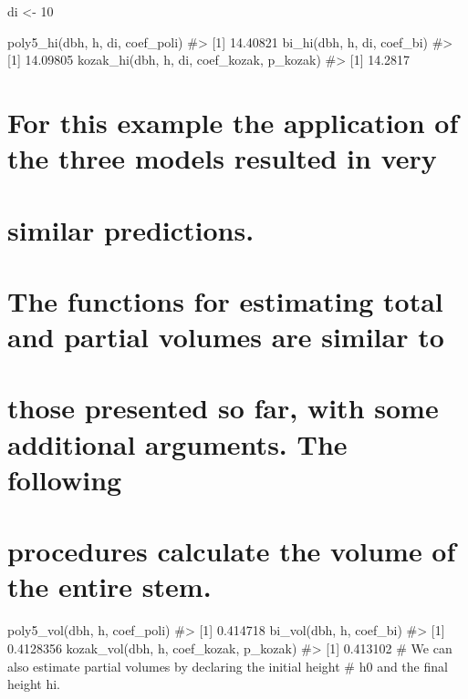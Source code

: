 \documentclass[
]{article}
\begin{document}
di \textless- 10

poly5\_hi(dbh, h, di, coef\_poli) \#\textgreater{} {[}1{]} 14.40821
bi\_hi(dbh, h, di, coef\_bi) \#\textgreater{} {[}1{]} 14.09805
kozak\_hi(dbh, h, di, coef\_kozak, p\_kozak) \#\textgreater{} {[}1{]}
14.2817

\hypertarget{for-this-example-the-application-of-the-three-models-resulted-in-very}{%
\section{For this example the application of the three models resulted
in
very}\label{for-this-example-the-application-of-the-three-models-resulted-in-very}}

\hypertarget{similar-predictions.}{%
\section{similar predictions.}\label{similar-predictions.}}

\hypertarget{the-functions-for-estimating-total-and-partial-volumes-are-similar-to}{%
\section{The functions for estimating total and partial volumes are
similar
to}\label{the-functions-for-estimating-total-and-partial-volumes-are-similar-to}}

\hypertarget{those-presented-so-far-with-some-additional-arguments.-the-following}{%
\section{those presented so far, with some additional arguments. The
following}\label{those-presented-so-far-with-some-additional-arguments.-the-following}}

\hypertarget{procedures-calculate-the-volume-of-the-entire-stem.}{%
\section{procedures calculate the volume of the entire
stem.}\label{procedures-calculate-the-volume-of-the-entire-stem.}}

poly5\_vol(dbh, h, coef\_poli) \#\textgreater{} {[}1{]} 0.414718
bi\_vol(dbh, h, coef\_bi) \#\textgreater{} {[}1{]} 0.4128356
kozak\_vol(dbh, h, coef\_kozak, p\_kozak) \#\textgreater{} {[}1{]}
0.413102 \# We can also estimate partial volumes by declaring the
initial height \# h0 and the final height hi.
\end{document}
